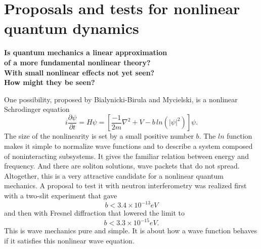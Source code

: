 \documentclass[pra, 12pt, showkeys, eqsecnum]{revtex4}
\begin{document}
\newpage

\section{Proposals and tests for nonlinear quantum dynamics}\label{two}

\smallskip
\large
\noindent
\textbf{Is quantum mechanics a linear approximation \\ of a more fundamental nonlinear theory? \\ With small nonlinear effects not yet seen? \\ How might they be seen?}
\normalsize
\bigskip

One possibility, proposed by Bialynicki-Birula and Mycielski\cite{BirulaMycielski}, is a nonlinear Schrodinger equation
\begin{equation}
\label{nlse}
i\frac{\partial \psi }{\partial t} = H\psi  = [\frac{-1}{2m}\nabla ^2 + V - b \, ln(|\psi |^2 )]\psi . 
\end{equation}
The size of the nonlinearity is set by a small positive number $b$. The $ln$ function makes it simple to normalize wave functions and to describe a system composed of noninteracting subsystems. It gives the familiar relation between energy and frequency. And there are soliton solutions, wave packets that do not spread. Altogether, this is a very attractive candidate for a nonlinear quantum mechanics. A proposal \cite{Shimony} to test it with neutron interferometry was realized first with a two-slit experiment \cite{ShullEtAl} that gave
\begin{equation}
 b < 3.4\times 10^{-13} eV 
\end{equation}
and then with Fresnel diffraction \cite{GahlerEtAl} that lowered the limit to
\begin{equation}
 b < 3.3\times 10^{-15} eV. 
\end{equation}
This is wave mechanics pure and simple. It is about how a wave function behaves if it satisfies this nonlinear wave equation.
\end{document}
